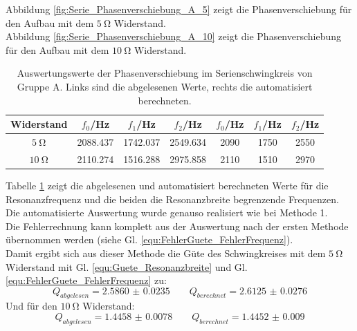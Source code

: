 \documentclass[12pt,a4paper]{article}
\begin{document}
Abbildung \ref{fig:Serie_Phasenverschiebung_A_5} zeigt die Phasenverschiebung für den Aufbau mit dem $\SI{5}{\ohm}$ Widerstand. \\
Abbildung \ref{fig:Serie_Phasenverschiebung_A_10} zeigt die Phasenverschiebung für den Aufbau mit dem $\SI{10}{\ohm}$ Widerstand.

\begin{table}
\centering
\begin{tabular}{|c|c|c|c||c|c|c|}
\hline
Widerstand & $f_0$/Hz & $f_1$/Hz & $f_2$/Hz & $f_0$/Hz & $f_1$/Hz & $f_2$/Hz \\
\hline
$\SI{5}{\ohm}$ & 2088.437 & 1742.037 & 2549.634 & 2090 & 1750 & 2550 \\
\hline
$\SI{10}{\ohm}$ & 2110.274 & 1516.288 & 2975.858 & 2110 & 1510 & 2970 \\
\hline
\end{tabular}
\caption{Auswertungswerte der Phasenverschiebung im Serienschwingkreis von Gruppe A. Links sind die abgelesenen Werte, rechts die automatisiert berechneten.}
\label{tab:StromPhasenverschiebung_A}
\end{table}

Tabelle \ref{tab:StromPhasenverschiebung_A} zeigt die abgelesenen und automatisiert berechneten Werte für die Resonanzfrequenz und die beiden die Resonanzbreite begrenzende Frequenzen. \\
Die automatisierte Auswertung wurde genauso realisiert wie bei Methode 1. \\
Die Fehlerrechnung kann komplett aus der Auswertung nach der ersten Methode übernommen werden (siehe Gl. \ref{equ:FehlerGuete_FehlerFrequenz}). \\
Damit ergibt sich aus dieser Methode die Güte des Schwingkreises mit dem $\SI{5}{\ohm}$ Widerstand mit Gl. \ref{equ:Guete_Resonanzbreite} und Gl. \ref{equ:FehlerGuete_FehlerFrequenz} zu:
\begin{equation*}
Q_{abgelesen} = \num{2.5860(235)} \qquad Q_{berechnet} = \num{2.6125(276)}
\end{equation*}
Und für den $\SI{10}{\ohm}$ Widerstand:
\begin{equation*}
Q_{abgelesen} = \num{1.4458(78)} \qquad Q_{berechnet} = \num{1.4452(90)}
\end{equation*}
\end{document}
